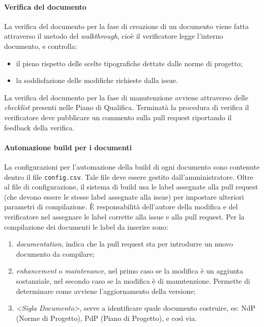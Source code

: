         \paragraph{Verifica del documento} \label{sec:doc_verification}
            La verifica del documento per la fase di creazione di un documento viene fatta attraverso il metodo del \emph{walkthrough}, cioè il verificatore legge l'interno documento, e controlla:
                \begin{itemize}
                    \item il pieno rispetto delle scelte tipografiche dettate dalle norme di progetto;
                    \item la soddisfazione delle modifiche richieste dalla issue.
                \end{itemize}
            La verifica del documento per la fase di manutenzione avviene attraverso delle \emph{checklist} presenti nelle Piano di Qualifica. Terminatà la procedura di verifica il verificatore deve pubblicare un commento sulla pull request riportando il feedback della verifica.
            
		\paragraph{Automazione build per i documenti} \label{sec:doc_CM}
		    La configurazioni per l'automazione della build di ogni documento sono contenute dentro il file \verb|config.csv|. Tale file deve essere gestito dall'amministratore.
		    Oltre al file di configurazione, il sistema di build usa le label assegnate alla pull request (che devono essere le stesse label assegnate alla issue) per impostare ulteriori parametri di compilazione.
		    È responsabilità dell'autore della modifica e del verificatore nel assegnare le label corrette alla issue e alla pull request. Per la compilazione dei documenti le label da inserire sono:
		    \begin{enumerate}
		    	\item \emph{documentation}, indica che la pull request sta per introdurre un nuovo documento da compilare;
		    	\item \emph{enhancement} o \emph{maintenance}, nel primo caso se la modifica è un aggiunta sostanziale, nel secondo caso se la modifica è di manutenzione. Permette di determinare come avviene l'aggiornamento della versione;
		    	\item \emph{<Sigla Documento>}, serve a identificare quale documento costruire, es: NdP (Norme di Progetto), PdP (Piano di Progetto), e così via.
		    \end{enumerate}
            
